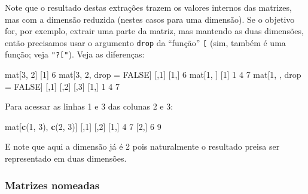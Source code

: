 \documentclass[10pt,a4paper]{book}
\newenvironment{Shaded}{\begin{snugshade}}{\end{snugshade}}
\newcommand{\KeywordTok}[1]{\textcolor[rgb]{0.13,0.29,0.53}{\textbf{#1}}}
\newcommand{\DecValTok}[1]{\textcolor[rgb]{0.00,0.00,0.81}{#1}}
\newcommand{\StringTok}[1]{\textcolor[rgb]{0.31,0.60,0.02}{#1}}
\newcommand{\OtherTok}[1]{\textcolor[rgb]{0.56,0.35,0.01}{#1}}
\newcommand{\NormalTok}[1]{#1}
\begin{document}
Note que o resultado destas extrações trazem os valores internos das
matrizes, mas com a dimensão reduzida (nestes casos para uma dimensão).
Se o objetivo for, por exemplo, extrair uma parte da matriz, mas
mantendo as duas dimensões, então precisamos usar o argumento
\texttt{drop} da ``função'' \texttt{{[}} (sim, também é uma função; veja
\texttt{"?{[}"}). Veja as diferenças:

\begin{Shaded}
\begin{Highlighting}[]
\NormalTok{mat[}\DecValTok{3}\NormalTok{, }\DecValTok{2}\NormalTok{]}
\NormalTok{[}\DecValTok{1}\NormalTok{] }\DecValTok{6}
\NormalTok{mat[}\DecValTok{3}\NormalTok{, }\DecValTok{2}\NormalTok{, drop =}\StringTok{ }\OtherTok{FALSE}\NormalTok{]}
\NormalTok{     [,}\DecValTok{1}\NormalTok{]}
\NormalTok{[}\DecValTok{1}\NormalTok{,]    }\DecValTok{6}
\NormalTok{mat[}\DecValTok{1}\NormalTok{, ]}
\NormalTok{[}\DecValTok{1}\NormalTok{] }\DecValTok{1} \DecValTok{4} \DecValTok{7}
\NormalTok{mat[}\DecValTok{1}\NormalTok{, , drop =}\StringTok{ }\OtherTok{FALSE}\NormalTok{]}
\NormalTok{     [,}\DecValTok{1}\NormalTok{] [,}\DecValTok{2}\NormalTok{] [,}\DecValTok{3}\NormalTok{]}
\NormalTok{[}\DecValTok{1}\NormalTok{,]    }\DecValTok{1}    \DecValTok{4}    \DecValTok{7}
\end{Highlighting}
\end{Shaded}

Para acessar as linhas 1 e 3 das colunas 2 e 3:

\begin{Shaded}
\begin{Highlighting}[]
\NormalTok{mat[}\KeywordTok{c}\NormalTok{(}\DecValTok{1}\NormalTok{, }\DecValTok{3}\NormalTok{), }\KeywordTok{c}\NormalTok{(}\DecValTok{2}\NormalTok{, }\DecValTok{3}\NormalTok{)]}
\NormalTok{     [,}\DecValTok{1}\NormalTok{] [,}\DecValTok{2}\NormalTok{]}
\NormalTok{[}\DecValTok{1}\NormalTok{,]    }\DecValTok{4}    \DecValTok{7}
\NormalTok{[}\DecValTok{2}\NormalTok{,]    }\DecValTok{6}    \DecValTok{9}
\end{Highlighting}
\end{Shaded}

E note que aqui a dimensão já é 2 pois naturalmente o resultado preisa
ser representado em duas dimensões.

\subsubsection{Matrizes nomeadas}\label{matrizes-nomeadas}
\end{document}
